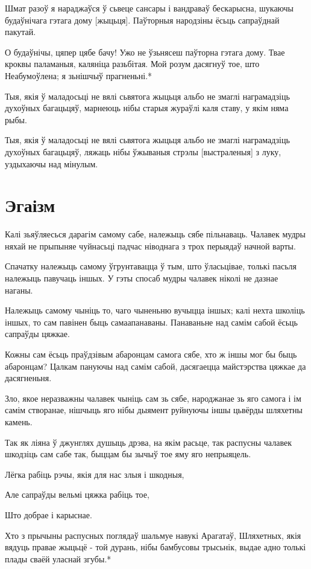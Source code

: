 \documentclass{article}
\begin{document}
Шмат разоў я нараджаўся ў сьвеце сансары і вандраваў бескарысна,
шукаючы будаўнічага гэтага дому {[}жыцьця{]}. Паўторныя народзіны ёсьць
сапраўднай пакутай.

О будаўнічы, цяпер цябе бачу! Ужо не ўзьнясеш паўторна гэтага дому.
Твае кроквы паламаныя, каляніца разьбітая. Мой розум дасягнуў тое, што
Неабумоўлена; я зьнішчыў прагненьні.*

Тыя, якія ў маладосьці не вялі сьвятога жыцьця альбо не змаглі
награмадзіць духоўных багацьцяў, марнеюць нібы старыя жураўлі каля
ставу, у якім няма рыбы.

Тыя, якія ў маладосьці не вялі сьвятога жыцьця альбо не змаглі
награмадзіць духоўных багацьцяў, ляжаць нібы ўжываныя стрэлы
{[}выстраленыя{]} з луку, уздыхаючы над мінулым.

\section{Эгаізм}

Калі зьяўляесься дарагім самому сабе, належыць сябе пільнаваць.
Чалавек мудры няхай не прыпыняе чуйнасьці падчас ніводнага з трох
перыядаў начной варты.

Спачатку належыць самому ўгрунтавацца ў тым, што ўласьцівае, толькі
пасьля належыць павучаць іншых. У гэты спосаб мудры чалавек ніколі не
дазнае наганы.

Належыць самому чыніць то, чаго чыненьню вучыцца іншых; калі нехта
школіць іншых, то сам павінен быць самаапанаваны. Панаваньне над самім
сабой ёсьць сапраўды цяжкае.

Кожны сам ёсьць праўдзівым абаронцам самога сябе, хто ж іншы мог бы
быць абаронцам? Цалкам пануючы над самім сабой, дасягаецца майстэрства
цяжкае да дасягненьня.

Зло, якое неразважны чалавек чыніць сам зь сябе, народжанае зь яго
самога і ім самім створанае, нішчыць яго нібы дыямент руйнуючы іншы
цьвёрды шляхетны камень.

Так як ліяна ў джунглях душыць дрэва, на якім расьце, так распусны
чалавек шкодзіць сам сабе так, быццам бы зычыў тое яму яго непрыяцель.

Лёгка рабіць рэчы, якія для нас злыя і шкодныя,

Але сапраўды вельмі цяжка рабіць тое,

Што добрае і карыснае.

Хто з прычыны распусных поглядаў шальмуе навукі Арагатаў,
Шляхетных, якія вядуць правае жыцьцё - той дурань, нібы бамбусовы
трысьнік, выдае адно толькі плады сваёй уласнай згубы.*
\end{document}
